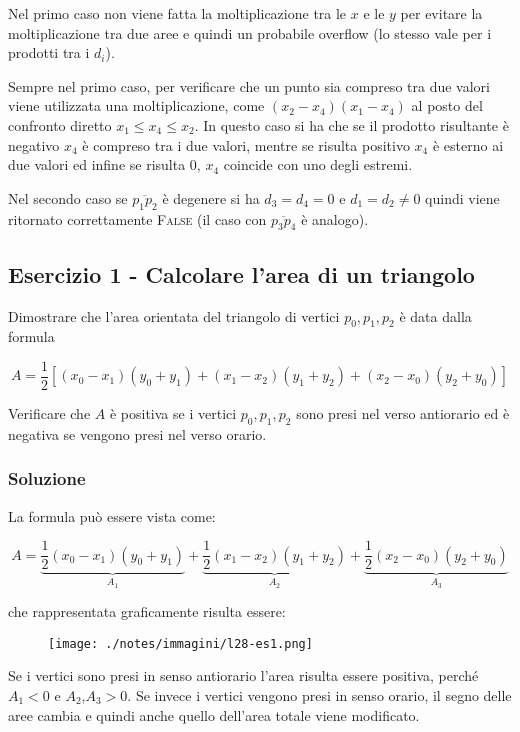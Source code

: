 Nel primo caso non viene fatta la moltiplicazione tra le $x$ e le $y$ per evitare la moltiplicazione tra due aree e quindi un probabile overflow (lo stesso vale per i prodotti tra i $d_i$).

Sempre nel primo caso, per verificare che un punto sia compreso tra due valori viene utilizzata una moltiplicazione, come $(x_2 - x_4)(x_1 - x_4)$ al posto del confronto diretto $x_1 \leq x_4 \leq x_2$. In questo caso si ha che se il prodotto risultante è negativo $x_4$ è compreso tra i due valori, mentre se risulta positivo $x_4$ è esterno ai due valori ed infine se risulta 0, $x_4$ coincide con uno degli estremi.

Nel secondo caso se $\overline{p_1p_2}$ è degenere si ha $d_3=d_4=0$ e $d_1 = d_2\neq 0$ quindi viene ritornato correttamente \textsc{False} (il caso con $\overline{p_3p_4}$ è analogo).

\subsection{Esercizio 1 - Calcolare l'area di un triangolo}\label{esercizio-1---calcolare-larea-di-un-triangolo}

Dimostrare che l'area orientata del triangolo di vertici $p_0, p_1, p_2$ è data dalla formula

$$
A = \frac{1}{2}[(x_0 -x_1)(y_0 +y_1)+(x_1 -x_2)(y_1 +y_2)+(x_2 -x_0)(y_2 +y_0)]
$$

Verificare che $A$ è positiva se i vertici $p_0, p_1, p_2$ sono presi nel verso antiorario ed è negativa se vengono presi nel verso orario.

\subsubsection{Soluzione}

La formula può essere vista come:

$$
A = \underbrace{\frac{1}{2}(x_0 -x_1)(y_0 +y_1)}_{A_1}+ \underbrace{\frac{1}{2}(x_1 -x_2)(y_1 +y_2)}_{A_2}+\underbrace{\frac{1}{2}(x_2 -x_0)(y_2 +y_0)}_{A_3}
$$

che rappresentata graficamente risulta essere:

\begin{figure}[htbp]
	\centering
	\texttt{[image: ./notes/immagini/l28-es1.png]}
\end{figure}

Se i vertici sono presi in senso antiorario l'area risulta essere positiva, perché $A_1 < 0 $ e $A_2$,$A_3 > 0$. Se invece i vertici vengono presi in senso orario, il segno delle aree cambia e quindi anche quello dell'area totale viene modificato. 

